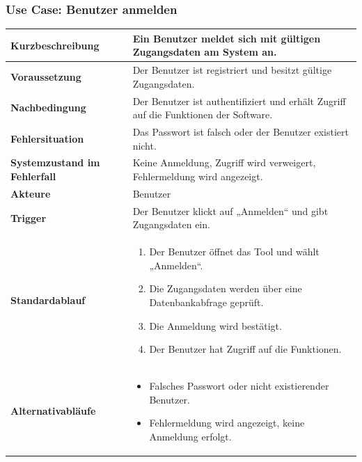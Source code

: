 \subsubsection*{Use Case: Benutzer anmelden}
\begin{tabular}{|p{5cm}|p{10cm}|}
\hline
\textbf{Kurzbeschreibung} & Ein Benutzer meldet sich mit gültigen Zugangsdaten am System an. \\
\hline
\textbf{Voraussetzung} & Der Benutzer ist registriert und besitzt gültige Zugangsdaten. \\
\hline
\textbf{Nachbedingung} & Der Benutzer ist authentifiziert und erhält Zugriff auf die Funktionen der Software. \\
\hline
\textbf{Fehlersituation} & Das Passwort ist falsch oder der Benutzer existiert nicht. \\
\hline
\textbf{Systemzustand im Fehlerfall} & Keine Anmeldung, Zugriff wird verweigert, Fehlermeldung wird angezeigt. \\
\hline
\textbf{Akteure} & Benutzer \\
\hline
\textbf{Trigger} & Der Benutzer klickt auf „Anmelden“ und gibt Zugangsdaten ein. \\
\hline
\textbf{Standardablauf} &
\begin{enumerate}
    \item Der Benutzer öffnet das Tool und wählt „Anmelden“.
    \item Die Zugangsdaten werden über eine Datenbankabfrage geprüft.
    \item Die Anmeldung wird bestätigt.
    \item Der Benutzer hat Zugriff auf die Funktionen.
\end{enumerate}
\\
\hline
\textbf{Alternativabläufe} &
\begin{itemize}
    \item Falsches Passwort oder nicht existierender Benutzer.
    \item Fehlermeldung wird angezeigt, keine Anmeldung erfolgt.
\end{itemize}
\\
\hline
\end{tabular}

\vspace{1cm}

